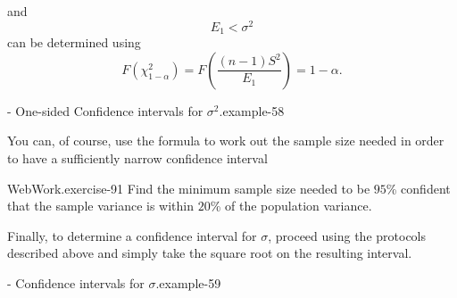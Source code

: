 \documentclass[10pt,]{book}
\numberwithin{equation}{section}
\newcommand{\lt}{<}
\begin{document}
and%
\begin{equation*}
E_1 \lt \sigma^2 
\end{equation*}
can be determined using%
\begin{equation*}
F(\chi^2_{1-\alpha} ) = F \left ( \frac{(n-1)S^2}{E_1} \right ) = 1 - \alpha.
\end{equation*}
\begin{example}{- One-sided Confidence intervals for \(\sigma^2\).}{example-58}%
\hypertarget{p-1342}{}%
%
\end{example}
%
\par
\hypertarget{p-1343}{}%
You can, of course, use the formula to work out the sample size needed in order to have a sufficiently narrow confidence interval%
\par
\hypertarget{p-1344}{}%
\begin{inlineexercise}{WebWork.}{exercise-91}%
\hypertarget{p-1345}{}%
Find the minimum sample size needed to be \(95\)\%  confident that the sample variance is within \(20\)\% of the population variance.%
\end{inlineexercise}
%
\par
\hypertarget{p-1347}{}%
Finally, to determine a confidence interval for \(\sigma\), proceed using the protocols described above and simply take the square root on the resulting interval. \begin{example}{- Confidence intervals for \(\sigma\).}{example-59}%
\hypertarget{p-1348}{}%
%
\end{example}
%
%
%
\typeout{************************************************}
\typeout{************************************************}
%
\end{document}
